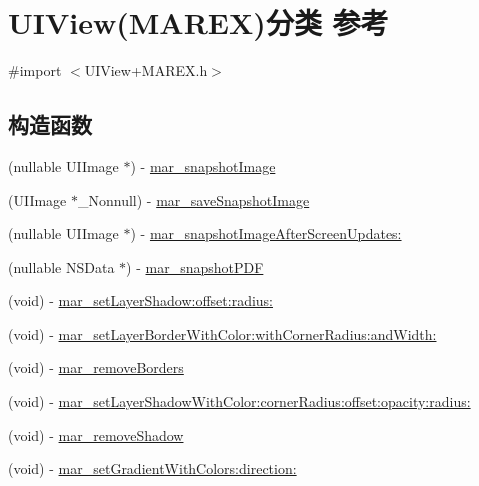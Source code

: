 \hypertarget{category_u_i_view_07_m_a_r_e_x_08}{}\section{U\+I\+View(M\+A\+R\+EX)分类 参考}
\label{category_u_i_view_07_m_a_r_e_x_08}


{\ttfamily \#import $<$U\+I\+View+\+M\+A\+R\+E\+X.\+h$>$}

\subsection*{构造函数}
\begin{DoxyCompactItemize}
\item 
(nullable U\+I\+Image $\ast$) -\/ \hyperlink{category_u_i_view_07_m_a_r_e_x_08_a232c29ddcbd9d35371da1a21b34dc076}{mar\+\_\+snapshot\+Image}
\item 
(U\+I\+Image $\ast$\+\_\+\+Nonnull) -\/ \hyperlink{category_u_i_view_07_m_a_r_e_x_08_a3cb40e1f4b4fba0a9bec07143e2f29fb}{mar\+\_\+save\+Snapshot\+Image}
\item 
(nullable U\+I\+Image $\ast$) -\/ \hyperlink{category_u_i_view_07_m_a_r_e_x_08_aa97274c96618d7290460e1d7032a2d2b}{mar\+\_\+snapshot\+Image\+After\+Screen\+Updates\+:}
\item 
(nullable N\+S\+Data $\ast$) -\/ \hyperlink{category_u_i_view_07_m_a_r_e_x_08_a89c1a0f5a880f9235f9b027eb17b6fa7}{mar\+\_\+snapshot\+P\+DF}
\item 
(void) -\/ \hyperlink{category_u_i_view_07_m_a_r_e_x_08_a09659084e40cac13d0ab0dae78143005}{mar\+\_\+set\+Layer\+Shadow\+:offset\+:radius\+:}
\item 
(void) -\/ \hyperlink{category_u_i_view_07_m_a_r_e_x_08_abecbc3495e4dd0c04a0c2817dadab8d7}{mar\+\_\+set\+Layer\+Border\+With\+Color\+:with\+Corner\+Radius\+:and\+Width\+:}
\item 
(void) -\/ \hyperlink{category_u_i_view_07_m_a_r_e_x_08_ab74a0b7c2872e884d29a431df3d5b771}{mar\+\_\+remove\+Borders}
\item 
(void) -\/ \hyperlink{category_u_i_view_07_m_a_r_e_x_08_a4e36de0f3f06b56b62e8b27aca687fa6}{mar\+\_\+set\+Layer\+Shadow\+With\+Color\+:corner\+Radius\+:offset\+:opacity\+:radius\+:}
\item 
(void) -\/ \hyperlink{category_u_i_view_07_m_a_r_e_x_08_ac9df5e8bd156743225208dfe7c2d10f5}{mar\+\_\+remove\+Shadow}
\item 
(void) -\/ \hyperlink{category_u_i_view_07_m_a_r_e_x_08_aab2ad10c46990470fe5c1dbd0ca5db6b}{mar\+\_\+set\+Gradient\+With\+Colors\+:direction\+:}

\end{DoxyCompactItemize}
